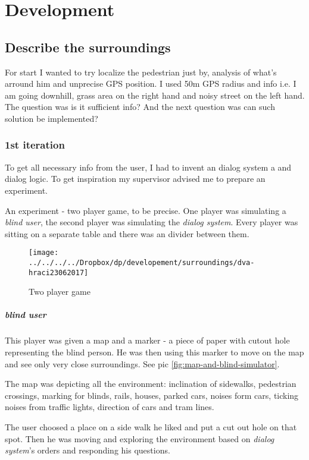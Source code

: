 	\chapter{Development}
		\section{Describe the surroundings}
			For start I wanted to try localize the pedestrian just by, analysis of what's arround him and unprecise GPS position. I used 50m GPS radius and info i.e. I am going downhill, grass area on the right hand and noisy street on the left hand. The question was is it sufficient info? And the next question was can such solution be implemented?
			\subsection{1st iteration}
				To get all necessary info from the user, I had to invent an dialog system a and dialog logic. To get inspiration my supervisor advised me to prepare an experiment.
				
				An experiment - two player game, to be precise. One player was simulating a \emph{blind user}, the second player was simulating the \emph{dialog system}. Every player was sitting on a separate table and there was an divider between them.
				
				\begin{figure}[th]
					\centering
					\texttt{[image: ../../../../Dropbox/dp/developement/surroundings/dva-hraci23062017]}
					\caption{Two player game}
					\label{fig:two-players}
				\end{figure}
			
				
				\paragraph{blind user}
					This player was given a map and a marker - a piece of paper with cutout hole representing the blind person. He was then using this  marker to move on the map and see only very close surroundings. See pic \ref{fig:map-and-blind-simulator}.
					
					The map was depicting all the environment: inclination of sidewalks, pedestrian crossings,
					marking for blinds, rails, houses, parked cars, noises form cars, ticking noises from traffic	lights, direction of cars and tram lines.
					
					The user choosed a place on a side walk he liked and put a cut out hole on that spot.
					Then he was moving and exploring the environment based
					on \emph{dialog system}'s orders and responding his questions.
